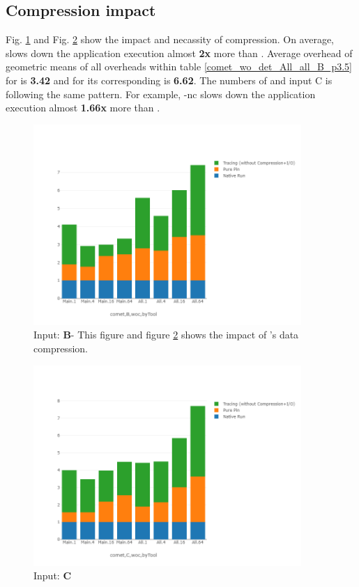 \subsection{Compression impact} 
\label{subsec:compact}

Fig. \ref{comet_chartDet_B_woc_byTool_p3_5} and Fig. \ref{comet_chartDet_C_woc_byTool_p3_5} show the impact and necassity of compression. On average, \parlotnc slows down the application execution almost \textbf{2x} more than \parlota. Average overhead of geometric means of all overheads within table \ref{comet_wo_det_All_all_B_p3.5} for \parlota is \textbf{3.42} and for its corresponding \parlotnc is \textbf{6.62}. The numbers of \parlotm and input C is following the same pattern. For example, \parlot-nc slows down the application execution almost \textbf{1.66x} more than \parlotm.


\begin{figure}[!t]
\centering
\includegraphics[width=4in]{figs.comet.newMed/comet_chartDet_B_woc_byTool_p3_5.png}
\caption{ Input: \textbf{B}- This figure and figure \ref{comet_chartDet_C_woc_byTool_p3_5} shows the impact of \parlot 's data compression.
}
\label{comet_chartDet_B_woc_byTool_p3_5}
\end{figure}

\begin{figure}[!t]
\centering
\includegraphics[width=4in]{figs.comet.newMed/comet_chartDet_C_woc_byTool_p3_5.png}
\caption{ Input: \textbf{C}
}
\label{comet_chartDet_C_woc_byTool_p3_5}
\end{figure}




